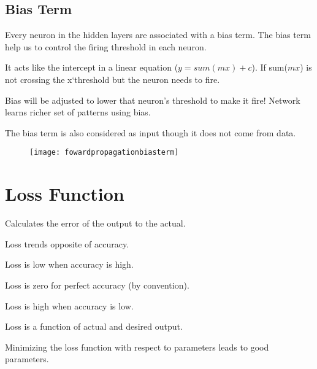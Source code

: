 	\subsection{Bias Term}
	\begin{bulletedlist}
		\item Every neuron in the hidden layers are associated with a bias term. The bias term help us to control the firing threshold in each neuron.
		\item It acts like the intercept in a linear equation ($y = sum(mx) + c$). If sum($mx$) is not crossing the x`threshold but the neuron needs to fire.
		\item Bias will be adjusted to lower that neuron's threshold to make it fire! Network learns richer set of patterns using bias.
		\item The bias term is also considered as input though it does not come from data.
	\end{bulletedlist}
 	\begin{figure}[h]
		\centering
		\texttt{[image: fowardpropagationbiasterm]}
		\caption{}
		\label{fig:fowardpropagationbiasterm}
	\end{figure}


	\section{Loss Function}
Calculates the error of the output to the actual.
	\begin{bulletedlist}
		\item Loss trends opposite of accuracy.
		\begin{bulletedlist}
			\item Loss is low when accuracy is high.
			\item Loss is zero for perfect accuracy (by convention).
			\item Loss is high when accuracy is low.
		\end{bulletedlist}
		\item Loss is a function of actual and desired output.
		\item Minimizing the loss function with respect to parameters leads to good parameters.
	\end{bulletedlist}

